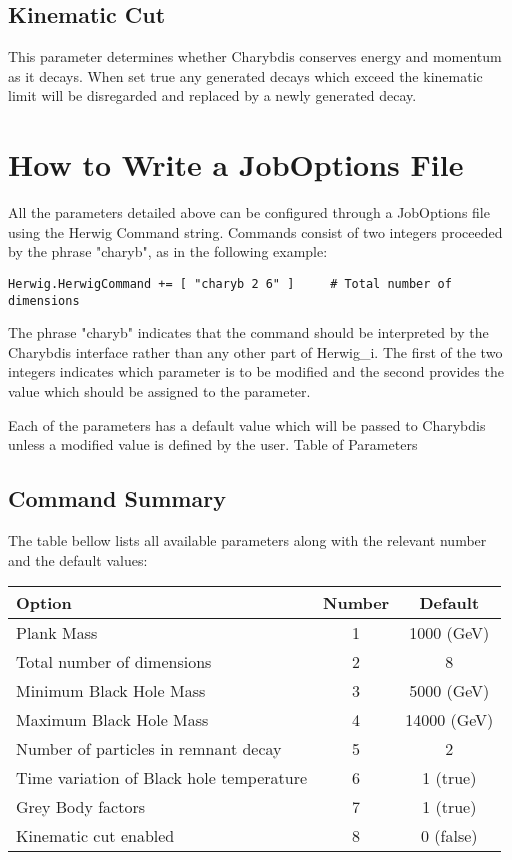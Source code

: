 \documentclass[11pt]{article}
\begin{document}
\subsection*{Kinematic Cut}

This parameter determines whether Charybdis conserves energy and
momentum as it decays. When set true any generated decays which exceed
the kinematic limit will be disregarded and replaced by a newly
generated decay.

\section*{How to Write a JobOptions File}

All the parameters detailed above can be configured through a
JobOptions file using the Herwig Command string. Commands consist of
two integers proceeded by the phrase "charyb", as in the following example:

\begin{verbatim}
Herwig.HerwigCommand += [ "charyb 2 6" ]     # Total number of dimensions
\end{verbatim}

The phrase "charyb" indicates that the command should be interpreted by the Charybdis interface rather than any other part of Herwig\_i. The first of the two integers indicates which parameter is to be modified and the second provides the value which should be assigned to the parameter.

Each of the parameters has a default value which will be passed to Charybdis unless a modified value is defined by the user.
Table of Parameters

\subsection*{Command Summary}

The table bellow lists all available parameters along with the relevant number and the default values:

\begin{tabular}{ l c c }
Option &	Number &	Default\\
\hline 
Plank Mass &	1 &	1000 (GeV)\\
Total number of dimensions &	2 &	8\\
Minimum Black Hole Mass &	3 &	5000 (GeV)\\
Maximum Black Hole Mass &	4 &	14000 (GeV)\\
Number of particles in remnant decay &	5 &	2\\
Time variation of Black hole temperature &	6 & 	1 (true)\\
Grey Body factors &	7 &	1 (true)\\
Kinematic cut enabled &	8 &	0 (false)\\
\end{tabular}
\end{document}
